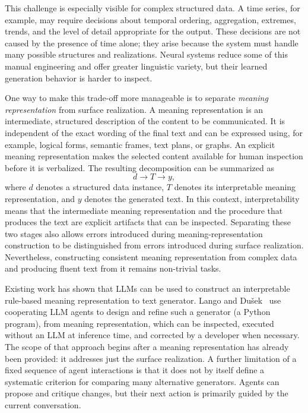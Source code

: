 This challenge is especially visible for complex structured data. A time series,
for example, may require decisions about temporal ordering, aggregation,
extremes, trends, and the level of detail appropriate for the output. These
decisions are not caused by the presence of time alone; they arise because the
system must handle many possible structures and realizations. Neural systems
reduce some of this manual engineering and offer greater linguistic variety, but
their learned generation behavior is harder to inspect.

One way to make this trade-off more manageable is to separate
\emph{meaning representation} from surface realization. A meaning representation is an
intermediate, structured description of the content to be communicated. It is
independent of the exact wording of the final text and can be expressed using,
for example, logical forms, semantic frames, text plans, or graphs. An explicit
meaning representation makes the selected content available for human inspection before
it is verbalized. The resulting decomposition can be summarized as
\begin{equation}
    d \longrightarrow T \longrightarrow y,
\end{equation}
where $d$ denotes a structured data instance, $T$ denotes its interpretable meaning
representation, and $y$ denotes the generated text. In this context,
interpretability means that the intermediate meaning representation and the procedure
that produces the text are explicit artifacts that can be inspected.
Separating these two stages also
allows errors introduced during meaning-representation construction to be
distinguished from errors introduced during surface realization.
Nevertheless, constructing consistent meaning representation from complex data
and producing fluent text from it remains non-trivial tasks.

Existing work has shown that LLMs can be used to construct an interpretable
rule-based meaning representation to text generator.
Lango and Dušek~\cite{lango-dusek-2025-llm} use cooperating LLM agents to design
and refine such a generator (a Python program), from meaning representation, which can be inspected, executed without an LLM at inference time, and corrected by a developer when necessary.
The scope of that approach begins after a meaning representation has already
been provided: it addresses just the surface realization.
A further limitation of a fixed sequence of agent interactions is that it does
not by itself define a systematic criterion for comparing many alternative
generators. Agents can propose and critique changes, but their next
action is primarily guided by the current conversation.

